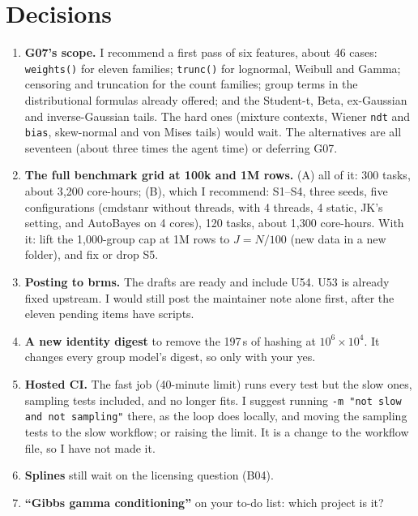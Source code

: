 \documentclass[11pt]{article}
\newcommand{\code}[1]{\texttt{#1}}
\begin{document}
\section{Decisions}
\label{sec:decisions}

\begin{enumerate}
\item \textbf{G07's scope.} I recommend a first pass of six features, about 46 cases: \code{weights()} for eleven families;
  \code{trunc()} for lognormal, Weibull and Gamma; censoring and truncation for the count families; group terms in the
  distributional formulas already offered; and the Student-t, Beta, ex-Gaussian and inverse-Gaussian tails. The hard ones
  (mixture contexts, Wiener \code{ndt} and \code{bias}, skew-normal and von Mises tails) would wait. The alternatives are all
  seventeen (about three times the agent time) or deferring G07.
\item \textbf{The full benchmark grid at 100k and 1M rows.} (A) all of it: 300 tasks, about 3{,}200 core-hours; (B), which I
  recommend: S1--S4, three seeds, five configurations (cmdstanr without threads, with 4 threads, 4 static, JK's setting, and
  AutoBayes on 4 cores), 120 tasks, about 1{,}300 core-hours. With it: lift the 1{,}000-group cap at 1M rows to
  $J = N/100$ (new data in a new folder), and fix or drop S5.
\item \textbf{Posting to brms.} The drafts are ready and include U54. U53 is already fixed upstream. I would still post the
  maintainer note alone first, after the eleven pending items have scripts.
\item \textbf{A new identity digest} to remove the 197\,s of hashing at $10^6 \times 10^4$. It changes every group model's
  digest, so only with your yes.
\item \textbf{Hosted CI.} The fast job (40-minute limit) runs every test but the slow ones, sampling tests included, and no
  longer fits. I suggest running \code{-m "not slow and not sampling"} there, as the loop does locally, and moving the
  sampling tests to the slow workflow; or raising the limit. It is a change to the workflow file, so I have not made it.
\item \textbf{Splines} still wait on the licensing question (B04).
\item \textbf{``Gibbs gamma conditioning''} on your to-do list: which project is it?
\end{enumerate}
\end{document}
